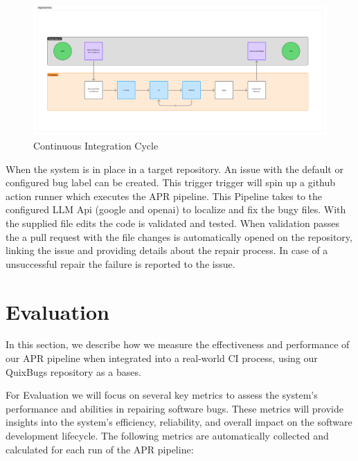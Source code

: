 \begin{figure}[H]
    \centering
    \includegraphics[width=1\textwidth]{images/high-level.png}
    \caption{Continuous Integration Cycle}
    \label{fig:high-level}
\end{figure}

When the system is in place in a target repository. An issue with the default or configured bug label can be created. This trigger trigger will spin up a github action runner which executes the APR pipeline. This Pipeline takes to the configured LLM Api (google and openai) to localize and fix the bugy files. With the supplied file edits the code is validated and tested. When validation passes the a pull request with the file changes is automatically opened on the repository, linking the issue and providing details about the repair process. In case of a unsuccessful repair the failure is reported to the issue.


\section{Evaluation} \label{section:evaluation}

In this section, we describe how we measure the effectiveness and performance of our APR pipeline when integrated into a real-world CI process, using our QuixBugs repository as a bases.

For Evaluation we will focus on several key metrics to assess the system's performance and abilities in repairing software bugs. These metrics will provide insights into the system's efficiency, reliability, and overall impact on the software development lifecycle. The following metrics are automatically collected and calculated for each run of the APR pipeline:

